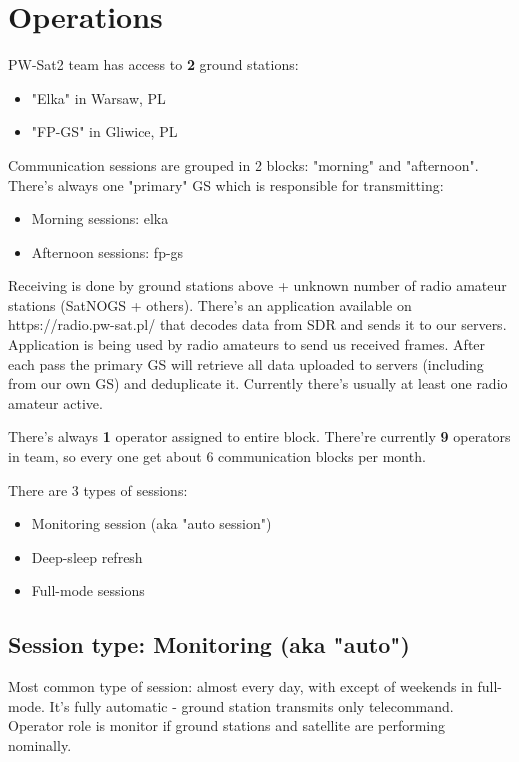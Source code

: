 \section {Operations}

PW-Sat2 team has access to \textbf{2} ground stations:

\begin{itemize}
\item "Elka" in Warsaw, PL
\item "FP-GS" in Gliwice, PL    
\end{itemize}

Communication sessions are grouped in 2 blocks: "morning" and "afternoon".
There's always one "primary" GS which is responsible for transmitting:
\begin{itemize}
\item Morning sessions: elka
\item Afternoon sessions: fp-gs
\end{itemize}

Receiving is done by ground stations above + unknown number of radio amateur stations (SatNOGS + others). There's an application available on https://radio.pw-sat.pl/ that decodes data from SDR and sends it to our servers. Application is being used by radio amateurs to send us received frames. After each pass the primary GS will retrieve all data uploaded to servers (including from our own GS) and deduplicate it. Currently there's usually at least one radio amateur active.

There's always \textbf{1} operator assigned to entire block. There're currently \textbf{9} operators in team, so every one get about 6 communication blocks per month.

There are 3 types of sessions:
\begin{itemize}    
    \item Monitoring session (aka "auto session")
    \item Deep-sleep refresh
    \item Full-mode sessions
\end{itemize}

\subsection{Session type: Monitoring (aka "auto")}        
Most common type of session: almost every day, with except of weekends in full-mode.  It's fully automatic - ground station transmits only  telecommand. Operator role is monitor if ground stations and satellite are performing nominally. 

